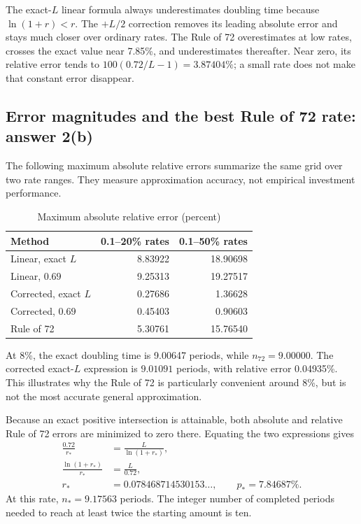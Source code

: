 \documentclass[11pt,letterpaper]{article}
\newcommand{\rOptRate}{7.84687}
\newcommand{\rOptPeriods}{9.17563}
\newcommand{\rEightTrue}{9.00647}
\newcommand{\rEightCorrectedError}{0.04935}
\begin{document}
The exact-$L$ linear formula always underestimates doubling time because
$\ln(1+r)<r$. The $+L/2$ correction removes its leading absolute error and stays
much closer over ordinary rates. The Rule of 72 overestimates at low rates,
crosses the exact value near 7.85\%, and underestimates thereafter. Near zero,
its relative error tends to $100(0.72/L-1)=3.87404\%$; a small rate does not make
that constant error disappear.
\clearpage
\subsection{Error magnitudes and the best Rule of 72 rate: answer 2(b)}
The following maximum absolute relative errors summarize the same grid over
two rate ranges. They measure approximation accuracy, not empirical investment performance.
\begin{table}[H]\centering\small\setlength{\tabcolsep}{5pt}\caption{Maximum absolute relative error (percent)}
\begin{tabular}{lrr}\toprule
Method & 0.1--20\% rates & 0.1--50\% rates\\\midrule
Linear, exact $L$ & 8.83922 & 18.90698\\
Linear, $0.69$ & 9.25313 & 19.27517\\
Corrected, exact $L$ & 0.27686 & 1.36628\\
Corrected, $0.69$ & 0.45403 & 0.90603\\
Rule of 72 & 5.30761 & 15.76540\\
\bottomrule\end{tabular}\end{table}

At 8\%, the exact doubling time is \rEightTrue{} periods, while $n_{72}=9.00000$.
The corrected exact-$L$ expression is $9.01091$ periods, with relative error
\rEightCorrectedError{}\%. This illustrates why the Rule of 72 is particularly
convenient around 8\%, but is not the most accurate general approximation.

Because an exact positive intersection is attainable, both absolute and relative
Rule of 72 errors are minimized to zero there. Equating the two expressions gives
\begin{align}
\frac{0.72}{r_*}&=\frac{L}{\ln(1+r_*)},\\
\frac{\ln(1+r_*)}{r_*}&=\frac{L}{0.72},\\
r_*&=\boxed{0.078468714530153\ldots},\qquad p_* = \rOptRate{}\%.
\end{align}
At this rate, $n_*=\rOptPeriods{}$ periods. The integer number of completed
periods needed to reach at least twice the starting amount is ten.
\end{document}
